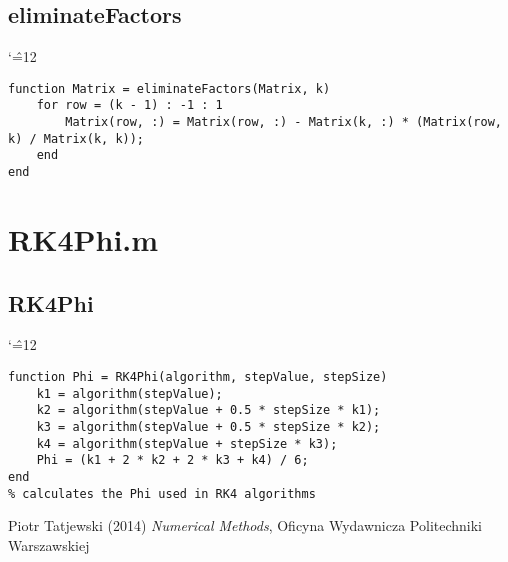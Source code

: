 \documentclass[12pt]{report}
\newenvironment{simplechar}{%
   \catcode`\^=12
}{}
\begin{document}
\subsection{eliminateFactors}
\begin{simplechar}
\begin{lstlisting}
function Matrix = eliminateFactors(Matrix, k)
    for row = (k - 1) : -1 : 1
        Matrix(row, :) = Matrix(row, :) - Matrix(k, :) * (Matrix(row, k) / Matrix(k, k));
    end
end

\end{lstlisting}
\end{simplechar}

\section{RK4Phi.m}
\subsection{RK4Phi}
\begin{simplechar}
\begin{lstlisting}
function Phi = RK4Phi(algorithm, stepValue, stepSize)
    k1 = algorithm(stepValue);
    k2 = algorithm(stepValue + 0.5 * stepSize * k1);
    k3 = algorithm(stepValue + 0.5 * stepSize * k2);
    k4 = algorithm(stepValue + stepSize * k3);
    Phi = (k1 + 2 * k2 + 2 * k3 + k4) / 6;
end
% calculates the Phi used in RK4 algorithms

\end{lstlisting}
\end{simplechar}




\begin{thebibliography}{9}
Piotr Tatjewski (2014) \emph{Numerical Methods}, Oficyna Wydawnicza Politechniki Warszawskiej
\end{thebibliography}
\end{document}
